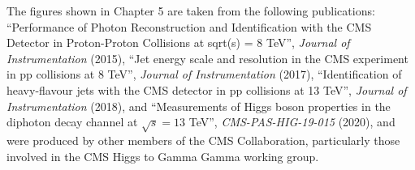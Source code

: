The figures shown in Chapter 5 are taken from the following publications: ``Performance of Photon Reconstruction and Identification with the CMS Detector in Proton-Proton Collisions at sqrt(s) = 8 TeV'', \emph{Journal of Instrumentation} (2015), ``Jet energy scale and resolution in the CMS experiment in pp collisions at 8 TeV'', \emph{Journal of Instrumentation} (2017), ``Identification of heavy-flavour jets with the CMS detector in pp collisions at 13 TeV'', \emph{Journal of Instrumentation} (2018), and ``Measurements of Higgs boson properties in the diphoton decay channel at $\sqrt{s} = 13$ TeV'', \emph{CMS-PAS-HIG-19-015} (2020), and were produced by other members of the CMS Collaboration, particularly those involved in the CMS Higgs to Gamma Gamma working group.
